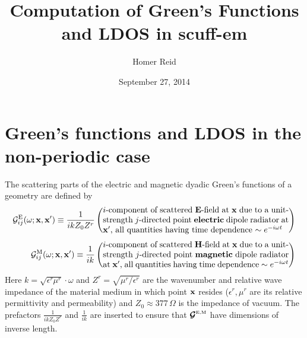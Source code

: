 \documentclass[letterpaper]{article}
\title {Computation of Green's Functions and LDOS in {\sc scuff-em}}
\author {Homer Reid}
\date {September 27, 2014}
\begin{document}
\pagestyle{myheadings}
\maketitle

\tableofcontents

\section{Green's functions and LDOS in the non-periodic case}

The scattering parts of the electric and magnetic
dyadic Green's functions of a geometry are defined by
\begin{align*}
 \mc G_{ij}\sups{E}(\omega; \vb x, \vb x^\prime)
   \equiv
   \frac{1}{ikZ_0 Z^r}
  &\left( \parbox{0.65\textwidth}
    { $i$-component of scattered $\vb E$-field at $\vb x$
      due to a unit-strength $j$-directed point \textbf{electric} 
      dipole radiator
      at $\vb x^\prime$, all quantities having time dependence
      $\sim e^{-i\omega t}$
    }
   \right)
\\[5pt]
 \mc G_{ij}\sups{M}(\omega; \vb x, \vb x^\prime)
   \equiv
   \frac{1}{ik}
  &\left( \parbox{0.65\textwidth}
    { $i$-component of scattered $\vb H$-field at $\vb x$
      due to a unit-strength $j$-directed point \textbf{magnetic}
      dipole radiator
      at $\vb x^\prime$, all quantities having time dependence
      $\sim e^{-i\omega t}$
    }
   \right)
\end{align*}
Here $k=\sqrt{\epsilon^r \mu^r }\cdot \omega$ and 
$Z^r=\sqrt{\mu^r /\epsilon^r }$ are the wavenumber and 
relative wave impedance of the material medium in which 
point $\mathbf{x}$ resides ($\epsilon^r ,\mu^r$ are its relative 
permittivity and permeability) and $Z_0\approx 377\,\Omega$  
is the impedance of vacuum. The prefactors 
$\frac{1}{ikZ_0Z^r}$ and $\frac{1}{ik}$ are inserted to 
ensure that $\boldsymbol{\mathcal{G}}^{\hbox{\tiny{E,M}}}$ have dimensions of inverse
length.
\end{document}
